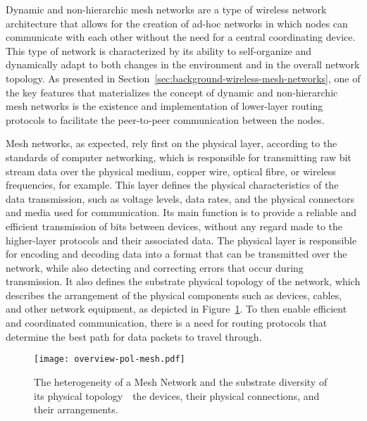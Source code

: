 Dynamic and non-hierarchic mesh networks are a type of wireless network architecture that allows for the creation of ad-hoc networks in which nodes can communicate with each other without the need for a central coordinating device. This type of network is characterized by its ability to self-organize and dynamically adapt to both changes in the environment and in the overall network topology. As presented in Section~\ref{sec:background-wireless-mesh-networks}, one of the key features that materializes the concept of dynamic and non-hierarchic mesh networks is the existence and implementation of lower-layer routing protocols to facilitate the peer-to-peer communication between the nodes.

Mesh networks, as expected, rely first on the physical layer, according to the standards of computer networking, which is responsible for transmitting raw bit stream data over the physical medium, copper wire, optical fibre, or wireless frequencies, for example. This layer defines the physical characteristics of the data transmission, such as voltage levels, data rates, and the physical connectors and media used for communication. Its main function is to provide a reliable and efficient transmission of bits between devices, without any regard made to the higher-layer protocols and their associated data. The physical layer is responsible for encoding and decoding data into a format that can be transmitted over the network, while also detecting and correcting errors that occur during transmission. It also defines the substrate physical topology of the network, which describes the arrangement of the physical components such as devices, cables, and other network equipment, as depicted in Figure~\ref{fig:proof-of-location-overview-pol-mesh}. To then enable efficient and coordinated communication, there is a need for routing protocols that determine the best path for data packets to travel through.

\begin{figure}[h!]
    \begin{center}
    \texttt{[image: overview-pol-mesh.pdf]}
    \caption{The heterogeneity of a Mesh Network and the substrate diversity of its physical topology~\textemdash~the devices, their physical connections, and their arrangements.}
    \label{fig:proof-of-location-overview-pol-mesh}
    \end{center}
\end{figure}

